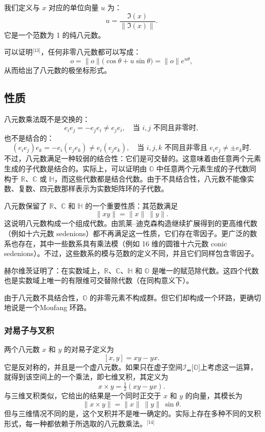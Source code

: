 我们定义与 $x$ 对应的单位向量 $u$ 为：
$$
u = \frac{\mathfrak{I}(x)}{\|\mathfrak{I}(x)\|}.~
$$
它是一个范数为 1 的纯八元数。

可以证明\(^\text{[13]}\)，任何非零八元数都可以写成：
$$
o = \|o\|\bigl(\cos \theta + u \sin \theta \bigr) = \|o\| e^{u\theta},~
$$
从而给出了八元数的极坐标形式。
\subsection{性质}
八元数乘法既不是交换的：
$$
e_{i} e_{j} = - e_{j} e_{i} \neq e_{j} e_{i}, \quad \text{当 } i, j \text{ 不同且非零时},~
$$
也不是结合的：
$$
(e_{i} e_{j}) e_{k} = - e_{i} (e_{j} e_{k}) \neq e_{i}(e_{j} e_{k}), \quad 
\text{当 } i, j, k \text{ 不同且非零且 } e_{i} e_{j} \neq \pm e_{k} \text{时}.~
$$
不过，八元数满足一种较弱的结合性：它们是可交替的。这意味着由任意两个元素生成的子代数是结合的。实际上，可以证明由 $\mathbb{O}$ 中任意两个元素生成的子代数同构于 $\mathbb{R}$、$\mathbb{C}$ 或 $\mathbb{H}$，而这些代数都是结合代数。由于不具结合性，八元数不能像实数、复数、四元数那样表示为实数矩阵环的子代数。

八元数保留了 $\mathbb{R}$、$\mathbb{C}$ 和 $\mathbb{H}$ 的一个重要性质：其范数满足
$$
\|xy\| = \|x\|\ \|y\|.~
$$
这说明八元数构成一个组成代数。由凯莱–迪克森构造继续扩展得到的更高维代数（例如十六元数 sedenions）都不再满足这一性质，它们存在零因子。更广泛的数系也存在，其中一些数系具有乘法模（例如 16 维的圆锥十六元数 conic sedenions）。不过，这些数系的模与范数的定义不同，并且它们同样包含零因子。

赫尔维茨证明了：在实数域上，$\mathbb{R}$、$\mathbb{C}$、$\mathbb{H}$ 和 $\mathbb{O}$ 是唯一的赋范除代数。这四个代数也是实数域上唯一的有限维可交替除代数（在同构意义下）。

由于八元数不具结合性，$\mathbb{O}$ 的非零元素不构成群。但它们却构成一个环路，更确切地说是一个Moufang 环路。
\subsubsection{对易子与叉积}
两个八元数 $x$ 和 $y$ 的对易子定义为
$$
[x,y] = xy - yx.~
$$
它是反对称的，并且是一个虚八元数。如果只在虚子空间$\operatorname{\mathcal{I_{m}}}\!\bigl[\mathbb{O}\bigr]$上考虑这一运算，就得到该空间上的一个乘法，即七维叉积，其定义为
$$
x \times y = \tfrac{1}{2}(xy - yx).~
$$
与三维叉积类似，它给出的结果是一个同时正交于 $x$ 和 $y$ 的向量，其模长为
$$
\|x \times y\| = \|x\| \ \|y\| \ \sin \theta.~
$$
但与三维情况不同的是，这个叉积并不是唯一确定的。实际上存在多种不同的叉积形式，每一种都依赖于所选取的八元数乘法。\(^\text{[14]}\)

